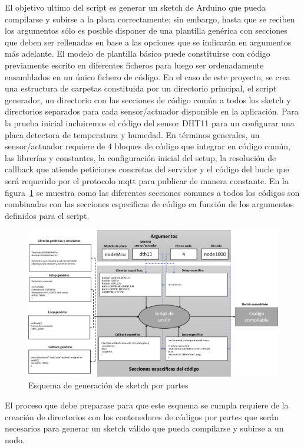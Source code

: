 El objetivo ultimo del \gls{script} es generar un \gls{sketch} de Arduino que pueda compilarse y subirse a la placa correctamente; sin embargo, hasta que se reciben los argumentos sólo es posible disponer de una plantilla genérica con secciones que deben ser rellenadas en base a las opciones que se indicarán en argumentos más adelante. El modelo de plantilla básico puede constituirse con código previamente escrito en diferentes ficheros para luego ser ordenadamente ensamblados en un único fichero de código. En el caso de este proyecto, se crea una estructura de carpetas constituida por un directorio principal, el script generador, un directorio con las secciones de código común a todos los \gls{sketch} y directorios separados para cada sensor/actuador disponible en la aplicación. Para la prueba inicial incluiremos el código del sensor DHT11 para un configurar una placa detectora de temperatura y humedad. En términos generales, un sensor/actuador requiere de 4 bloques de código que integrar en código común, las librerías y constantes, la configuración inicial del setup, la resolución de callback que atiende peticiones concretas del servidor y el código del bucle que será requerido por el protocolo \gls{mqtt} para publicar de manera constante. En la figura~\ref{sketchgeneratordiagram} se muestra como las diferentes secciones comunes a todos los códigos son combinadas con las secciones especificas de código en función de los argumentos definidos para el script.

\vspace{0.5cm}
\begin{figure}[hbt!]
\label{sketchgeneratordiagram}
\centering
\includegraphics[height=2.6in]{figures/sketchgenerator.png}
\caption[Esquema de generación de sketch por partes]{Esquema de generación de sketch por partes\footnotemark}
\end{figure}

El proceso que debe preparase para que este esquema se cumpla requiere de la creación de directorios con los contenedores de códigos por partes que serán necesarios para generar un \gls{sketch} válido que pueda compilarse y subirse a un nodo.

